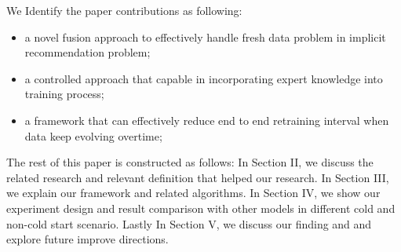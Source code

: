 We Identify the paper contributions as following:
\begin{itemize}
    \item a novel fusion approach to effectively handle fresh data problem in implicit recommendation problem;
    \item a controlled approach that capable in incorporating expert knowledge into training process;
    \item a framework that can effectively reduce end to end retraining interval when data keep evolving overtime;
\end{itemize}

The rest of this paper is constructed as follows: In Section II, we discuss the related research and relevant definition that helped our research. In Section III, we explain our framework and related algorithms. In Section IV, we show our experiment design and result comparison with other models in different cold and non-cold start scenario. Lastly In Section V, we discuss our finding and and explore future improve directions.
